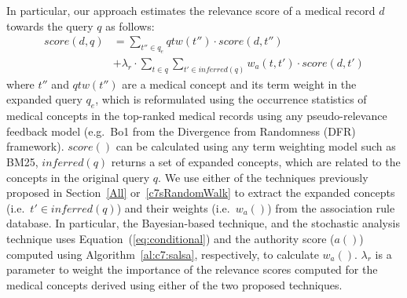 \documentclass[1p]{elsarticle}
\begin{document}
In particular, our approach estimates the relevance score of a medical record $d$ towards the query $q$ as follows:
\begin{align}\label{eq:combining}
score(d,q)& = \sum_{t'' \in q_e} qtw(t'') \cdot score(d,t'') \\ \nonumber
&+ \lambda_r \cdot \sum_{t \in q}\sum_{t' \in inferred(q)} w_a(t,t') \cdot score(d,t')
\end{align}
where $t''$ and $qtw(t'')$ are a medical concept and its term weight in the expanded query $q_e$, which is reformulated using the occurrence statistics of medical concepts in the top-ranked medical records using any pseudo-relevance feedback model (e.g.\ Bo1 from the Divergence from Randomness (DFR) framework). $score()$ can be calculated using any term weighting model such as BM25,
$inferred(q)$ returns a set of expanded concepts, which are related to the concepts in the original query $q$. We use either of the techniques previously proposed in Section~\ref{All} or~\ref{c7sRandomWalk} to extract the expanded concepts (i.e.\ $t' \in inferred(q)$) and their weights (i.e.\ $w_a()$) from the association rule database. In particular, the Bayesian-based technique, and the stochastic analysis technique uses Equation~(\ref{eq:conditional}) and the authority score ($a()$) computed using Algorithm~\ref{al:c7:salsa}, respectively, to calculate $w_a()$. $\lambda_r$ is a parameter to weight the importance of the relevance scores computed for the medical concepts derived using either of the two proposed techniques.
\end{document}
